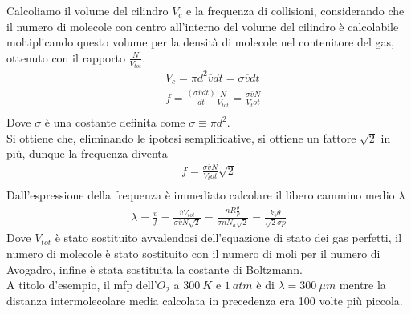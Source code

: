 \documentclass[10pt,a4paper]{article}
\begin{document}
\FloatBarrier
Calcoliamo il volume del cilindro $V_c$ e la frequenza di collisioni, considerando che il numero di molecole con centro all'interno del volume del cilindro è calcolabile moltiplicando questo volume per la densità di molecole nel contenitore del gas, ottenuto con il rapporto $\frac{N}{V_{tot}}$. 
\begin{align*}
	&V_c = \pi d^2 \overline{v} dt = \sigma \overline{v} dt\\
	&f = \frac{\left(\sigma \overline{v} dt\right)}{dt} \frac{N}{V_{tot}} = \frac{\sigma \overline{v} N}{V_tot}\\
\end{align*}
Dove $\sigma$ è una costante definita come $\sigma \equiv \pi d^2$.\\
Si ottiene che, eliminando le ipotesi semplificative, si ottiene un fattore $\sqrt{2}$ in più, dunque la frequenza diventa
\begin{align*}
f = \frac{\sigma \overline{v} N}{V_tot}\sqrt{2}\\
\end{align*}
Dall'espressione della frequenza è immediato calcolare il libero cammino medio $\lambda$
\begin{align*}
	\lambda = \frac{\overline{v}}{f} = \frac{\overline{v} V_{tot}}{\sigma \overline{v} N\sqrt{2}} = \frac{n R \frac{\theta}{p} }{\sigma n N_a \sqrt{2}} = \frac{k_b\theta}{\sqrt{2}\sigma p}
\end{align*}
Dove $V_{tot}$ è stato sostituito avvalendosi dell'equazione di stato dei gas perfetti, il numero di molecole è stato sostituito con il numero di moli per il numero di Avogadro, infine è stata sostituita la costante di Boltzmann.\\
A titolo d'esempio, il mfp dell'$O_2$ a $300\ K$ e $1\ atm$ è di $\lambda = 300\ \mu m$ mentre la distanza intermolecolare media calcolata in precedenza era 100 volte più piccola. 
\end{document}
